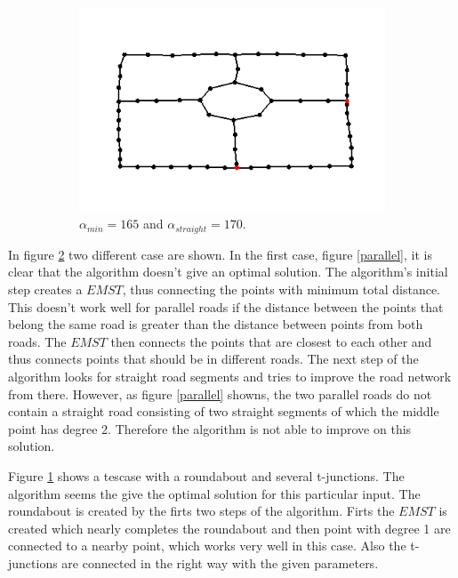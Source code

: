 \documentclass[11pt]{article}
\begin{document}
\begin{figure}[h]
\begin{subfigure}{0.4\linewidth}
  \includegraphics[width=\linewidth]{roundabout167_170}
  \caption{$\alpha_{min}=165$ and $\alpha_{straight}=170$.}
  \label{roundabout}
  \end{subfigure}
  \caption{}
  \label{testcases}
\end{figure}

In figure \ref{testcases} two different case are shown. In the first case, figure \ref{parallel}, it is clear that the algorithm doesn't give an optimal solution. The algorithm's initial step creates a $EMST$, thus connecting the points with minimum total distance. This doesn't work well for parallel roads if the distance between the points that belong the same road is greater than the distance between points from both roads. The $EMST$ then connects the points that are closest to each other and thus connects points that should be in different roads. The next step of the algorithm looks for straight road segments and tries to improve the road network from there. However, as figure \ref{parallel} showns, the two parallel roads do not contain a straight road consisting of two straight segments of which the middle point has degree 2. Therefore the algorithm is not able to improve on this solution.

Figure \ref{roundabout} shows a tescase with a roundabout and several t-junctions. The algorithm seems the give the optimal solution for this particular input. The roundabout is created by the firts two steps of the algorithm. Firts the $EMST$ is created which nearly completes the roundabout and then point with degree 1 are connected to a nearby point, which works very well in this case. Also the t-junctions are connected in the right way with the given parameters.
\end{document}
